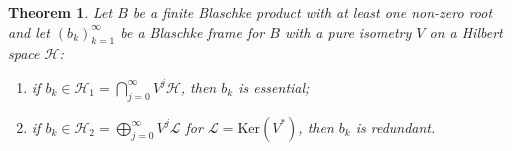 \documentclass[10pt, reqno]{amsart}
\newtheorem{theorem}{Theorem}[section]
\theoremstyle{definition}
\numberwithin{equation}{section}
\begin{document}

\begin{theorem}\label{everyvecisred}
    Let $B$ be a finite Blaschke product with at least one non-zero root and let $(b_{k})_{k=1}^{\infty}$ be a Blaschke frame for $B$ with a pure isometry $V$ on a Hilbert space $\mathcal{H}$:

    \begin{enumerate}
        \item if $b_{k}\in\mathcal{H}_{1}=\bigcap_{j=0}^{\infty}V^{j}\mathcal{H}$, then $b_{k}$ is essential;
        \item if $b_{k}\in\mathcal{H}_{2}=\bigoplus_{j=0}^{\infty}V^{j}\mathcal{L}$ for $\mathcal{L}=\mathrm{Ker}(V^{*})$, then $b_{k}$ is redundant.
    \end{enumerate}

\end{theorem}
\end{document}
